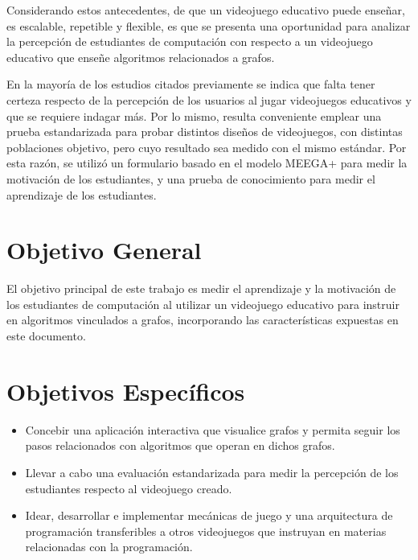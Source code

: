 Considerando estos antecedentes, de que un videojuego educativo puede enseñar, es escalable, repetible y flexible, es que se presenta una oportunidad para analizar la percepción de estudiantes de computación con respecto a un videojuego educativo que enseñe algoritmos relacionados a grafos.

En la mayoría de los estudios citados previamente se indica que falta tener certeza respecto de la percepción de los usuarios al jugar videojuegos educativos y que se requiere indagar más. Por lo mismo, resulta conveniente emplear una prueba estandarizada para probar distintos diseños de videojuegos, con distintas poblaciones objetivo, pero cuyo resultado sea medido con el mismo estándar. Por esta razón, se utilizó un formulario basado en el modelo MEEGA+ \cite{meegaplus} para medir la motivación de los estudiantes, y una prueba de conocimiento para medir el aprendizaje de los estudiantes.




\section{Objetivo General}

El objetivo principal de este trabajo es medir el aprendizaje y la motivación de los estudiantes de computación al utilizar un videojuego educativo para instruir en algoritmos vinculados a grafos, incorporando las características expuestas en este documento.

\section{Objetivos Específicos}

\begin{itemize}

\item Concebir una aplicación interactiva que visualice grafos y permita seguir los pasos relacionados con algoritmos que operan en dichos grafos.

\item Llevar a cabo una evaluación estandarizada para medir la percepción de los estudiantes respecto al videojuego creado.

\item Idear, desarrollar e implementar mecánicas de juego y una arquitectura de programación transferibles a otros videojuegos que instruyan en materias relacionadas con la programación.


\end{itemize}



